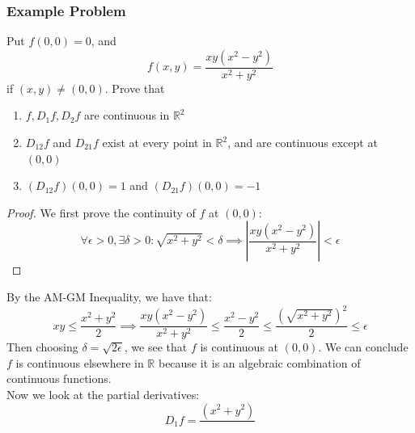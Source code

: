 \documentclass[10pt,letterpaper]{article} %
\begin{document}
\subsubsection{Example Problem}
Put $f(0, 0) = 0$, and
\begin{equation*}
f(x, y) = \frac{xy(x^2 - y^2)}{x^2 + y^2}
\end{equation*}
if $(x, y) \neq (0, 0)$. Prove that
\begin{enumerate}
\item $f, D_1f, D_2f$ are continuous in $\mathbb{R}^2$
\item $D_{12}f$ and $D_{21}f$ exist at every point in $\mathbb{R}^2$, and are continuous except at $(0, 0)$
\item $(D_{12}f)(0, 0) = 1$ and $(D_{21}f)(0, 0) = -1$
\end{enumerate}

\begin{proof}
We first prove the continuity of $f$ at $(0, 0)$:
\begin{equation*}
\forall \epsilon > 0, \exists \delta > 0: \sqrt{x^2 + y^2} < \delta \implies \left|\frac{xy(x^2 - y^2)}{x^2 + y^2}\right| < \epsilon
\end{equation*}
\end{proof}
By the AM-GM Inequality, we have that:
\begin{equation*}
xy \leqslant \frac{x^2 + y^2}{2} \implies \frac{xy(x^2-y^2)}{x^2 + y^2} \leqslant \frac{x^2 - y^2}{2} \leqslant \frac{(\sqrt{x^2+y^2})^2}{2} \leqslant \epsilon
\end{equation*}
Then choosing $\delta = \sqrt{2\epsilon}$, we see that $f$ is continuous at $(0, 0)$. We can conclude $f$ is continuous elsewhere in $\mathbb{R}$ because it is an algebraic combination of continuous functions.\\

Now we look at the partial derivatives:
\begin{equation*}
D_1f = \frac{(x^2+y^2)}{}
\end{equation*}
\end{document}
